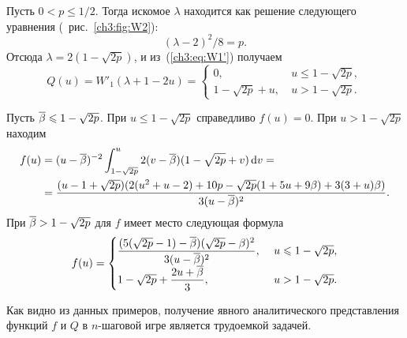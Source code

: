 {\begin{example}
  Пусть $0 < p \leq 1/2$.
  Тогда искомое $\lambda$ находится как решение следующего уравнения (\seename~рис.~\ref{ch3:fig:W2}):
  \begin{equation*}
    (\lambda - 2)^2/8 = p.
  \end{equation*}
  Отсюда $\lambda = 2(1-\sqrt{2p})$, и из~(\ref{ch3:eq:W1'}) получаем
  \begin{equation*}
    Q(u) = W'_1(\lambda + 1 - 2u) = \begin{cases}
      0,\ & u \leq 1 - \sqrt{2p},\\
      1 - \sqrt{2p} + u,\ & u > 1 - \sqrt{2p}.
    \end{cases}
  \end{equation*}
  
  Пусть ${{\overline{\beta}}} \leqslant 1 - \sqrt{2p}$.
  При $u \leq 1 - \sqrt{2p}$ справедливо $f(u) = 0$.
  При $u > 1 - \sqrt{2p}$ находим
  \begin{align*}
    f(u) 
    &= (u-{{\overline{\beta}}})^{-2} \int_{1-\sqrt{2p}}^u 2 (v-{{\overline{\beta}}}) (1-\sqrt{2p}+v) \mathop{}\!\mathrm{d} v = \\
    &= \frac{(u - 1 + \sqrt{2p})(2(u^2 + u - 2) + 10p - \sqrt{2p}(1+5u+9\beta) + 3(3+u)\beta)}{3(u-{{\overline{\beta}}})^2}.
  \end{align*}
  При ${{\overline{\beta}}} > 1 - \sqrt{2p}$ для $f$ имеет место следующая формула
  \begin{equation*}
    f(u) =
    \begin{cases}
      {\displaystyle \frac{(5(\sqrt{2p}-1) - \ensuremath{{{\overline{\beta}}}})(\sqrt{2p} - \ensuremath{\beta})^2}{3(u - \ensuremath{{{\overline{\beta}}}})^2}},\ & u \leqslant 1 - \sqrt{2p}, \\
      1 - \sqrt{2p} + {\displaystyle \frac{2u + {{\overline{\beta}}}}{3}},\ & u > 1 - \sqrt{2p}.
    \end{cases}
  \end{equation*}
\end{example}

Как видно из данных примеров, получение явного аналитического представления функций $f$ и $Q$ в $n$-шаговой игре является трудоемкой задачей.
}

